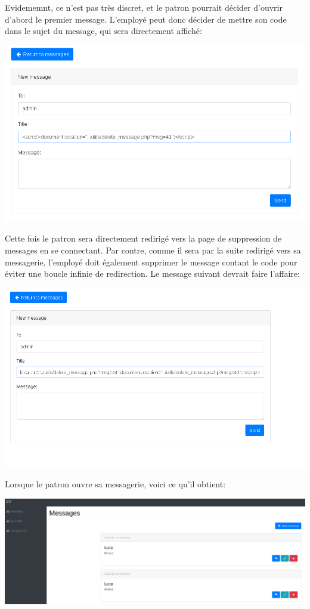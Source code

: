 \documentclass{article}
\begin{document}
Evidememnt, ce n'est pas très discret, et le patron pourrait décider
d'ouvrir d'abord le premier message. L'employé peut donc décider de
mettre son code dans le sujet du message, qui sera directement affiché:

\includegraphics{images/delete5.PNG}

Cette fois le patron sera directement redirigé vers la page de
suppression de messages en se connectant. Par contre, comme il sera par
la suite redirigé vers sa messagerie, l'employé doit également supprimer
le message contant le code pour éviter une boucle infinie de
redirection. Le message suivant devrait faire l'affaire:

\includegraphics{images/delete7.PNG}

Lorsque le patron ouvre sa messagerie, voici ce qu'il obtient:

\includegraphics{images/delete8.PNG}
\end{document}
